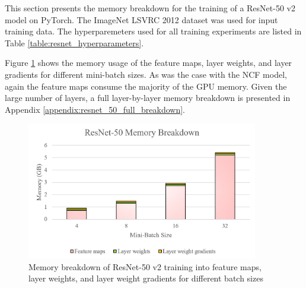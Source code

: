 \documentclass[12pt,letterpaper]{article}
\begin{document}
%
%

This section presents the memory breakdown for the training of a ResNet-50 v2 \cite{resnet} model on PyTorch. The ImageNet LSVRC 2012 dataset \cite{imagenet2012} was used for input training data. The hyperparemeters used for all training experiments are listed in Table \ref{table:resnet_hyperparameters}.

\begin{table}[H]
\centering
{}
\caption{Hyperparameters used for ResNet-50 v2 memory profiling experiments}
\label{table:resnet_hyperparameters}
\end{table}

Figure \ref{fig:resnet_bar_graph} shows the memory usage of the feature maps, layer weights, and layer gradients for different mini-batch sizes. As was the case with the NCF model, again the feature maps consume the majority of the GPU memory. Given the large number of layers, a full layer-by-layer memory breakdown is presented in Appendix \ref{appendix:resnet_50_full_breakdown}.
\begin{figure}[H]
\centering
\includegraphics[width=0.9\textwidth]{resnet_bar_graphs.PNG}
\captionsetup{width=0.8\linewidth}
\caption{Memory breakdown of ResNet-50 v2 training into feature maps, layer weights, and layer weight gradients for different batch sizes}
\label{fig:resnet_bar_graph}
\end{figure}
\end{document}
